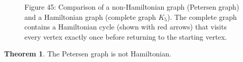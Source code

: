 \documentclass{article}
\theoremstyle{definition}
\newtheorem{theorem}{Theorem}
\begin{document}
\begin{figure}[H]
    
    \begin{center}
    \small Figure 45: Comparison of a non-Hamiltonian graph (Petersen graph) and a Hamiltonian graph (complete graph $K_5$). The complete graph contains a Hamiltonian cycle (shown with red arrows) that visits every vertex exactly once before returning to the starting vertex.
    \end{center}
\end{figure}

\begin{theorem}
The Petersen graph is not Hamiltonian.
\end{theorem}
\end{document}
